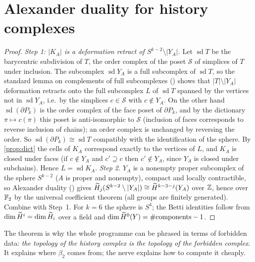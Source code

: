 \section{Alexander duality for history complexes}
\begin{proof}
\emph{Step 1: $|K_A|$ is a deformation retract of $S^{k-2}\setminus|Y_A|$.} Let $\operatorname{sd}T$ be the barycentric subdivision of $T$, the order complex of the poset $\mathcal S$ of simplices of $T$ under inclusion. The subcomplex $\operatorname{sd}Y_A$ is a full subcomplex of $\operatorname{sd}T$, so the standard lemma on complements of full subcomplexes (\cite[\S70]{Munkres}) shows that $|T|\setminus|Y_A|$ deformation retracts onto the full subcomplex $L$ of $\operatorname{sd}T$ spanned by the vertices not in $\operatorname{sd}Y_A$, i.e.\ by the simplices $c\in\mathcal S$ with $c\notin Y_A$. On the other hand $\operatorname{sd}(\partial P_k)$ is the order complex of the face poset of $\partial P_k$, and by the dictionary $\pi\mapsto c(\pi)$ this poset is anti-isomorphic to $\mathcal S$ (inclusion of faces corresponds to reverse inclusion of chains); an order complex is unchanged by reversing the order. So $\operatorname{sd}(\partial P_k)\cong\operatorname{sd}T$ compatibly with the identification of the sphere. By \cref{prop:dict} the cells of $K_A$ correspond exactly to the vertices of $L$, and $K_A$ is closed under faces (if $c\notin Y_A$ and $c'\supseteq c$ then $c'\notin Y_A$, since $Y_A$ is closed under subchains). Hence $L=\operatorname{sd}K_A$.
\emph{Step 2.} $Y_A$ is a nonempty proper subcomplex of the sphere $S^{k-2}$ ($A$ is proper and nonempty), compact and locally contractible, so Alexander duality (\cite[Thm.~3.44]{Hatcher}) gives $\widetilde{H}_j(S^{k-2}\setminus|Y_A|)\cong\widetilde{H}^{k-3-j}(Y_A)$ over $\mathbb{Z}$, hence over $\mathbb{F}_2$ by the universal coefficient theorem (all groups are finitely generated). Combine with Step~1. For $k=6$ the sphere is $S^4$; the Betti identities follow from $\dim\widetilde{H}^i=\dim\widetilde{H}_i$ over a field and $\dim\widetilde{H}^0(Y)=\#\mathrm{components}-1$.
\end{proof}
The theorem is why the whole programme can be phrased in terms of forbidden data: \emph{the topology of the history complex is the topology of the forbidden complex}. It explains where $\beta_2$ comes from; the nerve explains how to compute it cheaply.

